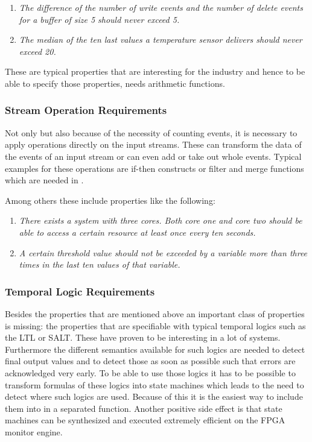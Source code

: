 \begin{enumerate}
	\item \textit{The difference of the number of write events and the number of delete events for a buffer of size 5 should never exceed 5.}
	\item \textit{The median of the ten last values a temperature sensor delivers should never exceed 20.}
\end{enumerate}

These are typical properties that are interesting for the industry and hence to be able to specify those properties, \tessla needs arithmetic functions.

\subsubsection{Stream Operation Requirements}

Not only but also because of the necessity of counting events, it is necessary to apply operations directly on the input streams. These can transform the data of the events of an input stream or can even add or take out whole events. Typical examples for these operations are if-then constructs or filter and merge functions which are needed in \tessla.

Among others these include properties like the following:

\begin{enumerate}
	\item \textit{There exists a system with three cores. Both core one and core two should be able to access a certain resource at least once every ten seconds.}
	\item \textit{A certain threshold value should not be exceeded by a variable more than three times in the last ten values of that variable.}
\end{enumerate}

\subsubsection{Temporal Logic Requirements}

Besides the properties that are mentioned above an important class of properties is missing: the properties that are specifiable with typical temporal logics such as the LTL or SALT. These have proven to be interesting in a lot of systems. Furthermore the different semantics available for such logics are needed to detect final output values and to detect those as soon as possible such that errors are acknowledged very early. To be able to use those logics it has to be possible to transform formulas of these logics into state machines which leads to the need to detect where such logics are used. Because of this it is the easiest way to include them into \tessla in a separated function. Another positive side effect is that state machines can be synthesized and executed extremely efficient on the FPGA monitor engine.

